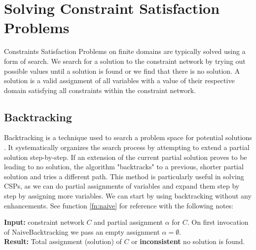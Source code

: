 \chapter{Solving Constraint Satisfaction Problems} \label{chap:solveCSP}

Constraints Satisfaction Problems on finite domains are typically solved using a form of search. We search for a solution to the constraint network by trying out possible values until a solution is found or we find that there is no solution. A solution is a valid assignment of all variables with a value of their respective domain satisfying all constraints within the constraint network.

\section{Backtracking}

Backtracking is a technique used to search a problem space for potential solutions \cite{backtracking:1975}. It systematically organizes the search process by attempting to extend a partial solution step-by-step. If an extension of the current partial solution proves to be leading to no solution, the algorithm "backtracks" to a previous, shorter partial solution and tries a different path. This method is particularly useful in solving CSPs, as we can do partial assignments of variables and expand them step by step by assigning more variables. We can start by using backtracking without any enhancements. See function \ref{fn:naive} for reference with the following notes:

\textbf{Input:} constraint network $C$ and partial assignment $\alpha$ for $C$. On first invocation of NaiveBacktracking we pass an empty assignment $\alpha = \emptyset$. \\
\textbf{Result:} Total assignment (solution) of $C$ or \textbf{inconsistent} no solution is found.\\

